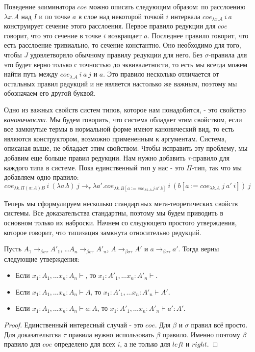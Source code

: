 \documentclass{amsart}
\theoremstyle{definition}
\theoremstyle{remark}
\newcommand{\bs}{\beta\sigma}
\newcommand{\bst}{\bs\tau}
\newcommand{\rbst}{\to_{\bst}}
\numberwithin{figure}{section}
\begin{document}

Поведение элиминатора $coe$ можно описать следующим образом:
по расслоению $\lambda x. A$ над $I$ и по точке $a$ в слое над некоторой точкой $i$ интервала $coe_{\lambda x. A}\ i\ a$ конструирует сечение этого расслоения.
Первое правило редукции для $coe$ говорит, что это сечение в точке $i$ возвращает $a$.
Последнее правило говорит, что есть расслоение тривиально, то сечение константно.
Оно необходимо для того, чтобы $J$ удовлетворяло обычному правилу редукции для него.
Без $\sigma$-правила для это будет верно только с точностью до эквивалетности, то есть мы всегда можем найти путь между $coe_{\lambda. A}\ i\ a\ j$ и $a$.
Это правило несколько отличается от остальных правил редукций и не является настолько же важным, поэтому мы обозначаем его другой буквой.

Одно из важных свойств систем типов, которое нам понадобится, - это свойство \emph{каноничности}.
Мы будем говорить, что система обладает этим свойством, если все замкнутые термы в нормальной форме имеют канонический вид,
    то есть являются конструктором, возможно примененным к аргументам.
Система, описаная выше, не обладает этим свойством.
Чтобы исправить эту проблему, мы добавим еще больше правил редукции.
Нам нужно добавить $\tau$-правило для каждого типа в системе.
Пока единственный тип у нас - это $\Pi$-тип, так что мы добавляем одно правило:
\[ coe_{\lambda k. \Pi (a : A) B}\ i\ (\lambda a. b)\ j \to_\tau \lambda a'. coe_{\lambda k. B[a := coe_{\lambda k. A}\,j\,a'\,k]}\ i\ (b[a := coe_{\lambda k. A}\ j\ a'\ i])\ j \]

Теперь мы сформулируем несколько стандартных мета-теоретических свойств системы.
Все доказательства стандартны, поэтому мы будем приводить в основном только их наброски.
Начнем со следующего простого утверждения, которое говорит, что типизация замкнута относительно редукций.
\begin{prop}
Пусть $A_1 \rbst A'_1$, \ldots $A_n \rbst A'_n$, $A \rbst A'$ и $a \rbst a'$.
Тогда верны следующие утверждения:
\begin{itemize}
\item Если $x_1 : A_1, \ldots x_n : A_n \vdash$, то $x_1 : A'_1, \ldots x_n : A'_n \vdash$.
\item Если $x_1 : A_1, \ldots x_n : A_n \vdash A$, то $x_1 : A'_1, \ldots x_n : A'_n \vdash A'$.
\item Если $x_1 : A_1, \ldots x_n : A_n \vdash a : A$, то $x_1 : A'_1, \ldots x_n : A'_n \vdash a' : A'$.
\end{itemize}
\end{prop}
\begin{proof}
Единственный интересный случай - это $coe$.
Для $\beta$ и $\sigma$ правил всё просто.
Для доказательтсва $\tau$ правила нужно использовать $\beta$ правило.
Именно поэтому $\beta$ правило для $coe$ определено для всех $i$, а не только для $left$ и $right$.
\end{proof}
\end{document}
